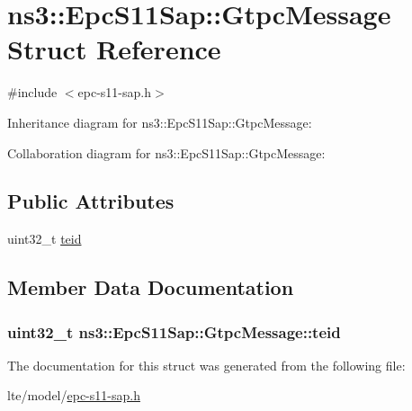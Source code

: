 \hypertarget{structns3_1_1EpcS11Sap_1_1GtpcMessage}{}\section{ns3\+:\+:Epc\+S11\+Sap\+:\+:Gtpc\+Message Struct Reference}
\label{structns3_1_1EpcS11Sap_1_1GtpcMessage}


{\ttfamily \#include $<$epc-\/s11-\/sap.\+h$>$}



Inheritance diagram for ns3\+:\+:Epc\+S11\+Sap\+:\+:Gtpc\+Message\+:


Collaboration diagram for ns3\+:\+:Epc\+S11\+Sap\+:\+:Gtpc\+Message\+:
\subsection*{Public Attributes}
\begin{DoxyCompactItemize}
\item 
uint32\+\_\+t \hyperlink{structns3_1_1EpcS11Sap_1_1GtpcMessage_a3891c3137b817ec376e3f383b6f264d9}{teid}
\end{DoxyCompactItemize}


\subsection{Member Data Documentation}
\subsubsection[{\texorpdfstring{teid}{teid}}]{\setlength{\rightskip}{0pt plus 5cm}uint32\+\_\+t ns3\+::\+Epc\+S11\+Sap\+::\+Gtpc\+Message\+::teid}\hypertarget{structns3_1_1EpcS11Sap_1_1GtpcMessage_a3891c3137b817ec376e3f383b6f264d9}{}\label{structns3_1_1EpcS11Sap_1_1GtpcMessage_a3891c3137b817ec376e3f383b6f264d9}


The documentation for this struct was generated from the following file\+:\begin{DoxyCompactItemize}
\item 
lte/model/\hyperlink{epc-s11-sap_8h}{epc-\/s11-\/sap.\+h}\end{DoxyCompactItemize}
